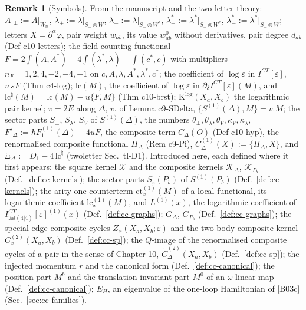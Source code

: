 \documentclass[11pt]{article}
\numberwithin{equation}{section}
\theoremstyle{plain}
\theoremstyle{definition}
\newtheorem{remark}[theorem]{Remark}
\newcommand{\Ap}{A|_{\perp}}
\begin{document}
\begin{remark}[Symbols]
\label{rem:cc-symbols}
From the manuscript and the two-letter theory: $\Ap:=A|_{W_{\mathbb R}^\perp}$, $\lambda_+:=\lambda|_{S_+\otimes W}$, $\lambda_-:=\lambda|_{S_-\otimes W^*}$, $\lambda^*_+:=\lambda^*|_{S_+\otimes W^*}$, $\lambda^*_-:=\lambda^*|_{S_-\otimes W}$; letters $X=\partial^\alpha\varphi$, pair weight $w_{ab}$, its value $w^0_{ab}$ without derivatives, pair degree $d_{ab}$ (Def c10-letters); the field-counting functional $F=2\int(A,A^*)-4\int(\lambda^*,\lambda)-\int(c^*,c)$ with multipliers $n_F=1,2,4,-2,-4,-1$ on $c,A,\lambda,A^*,\lambda^*,c^*$; the coefficient of $\log\varepsilon$ in $I^{CT}[\varepsilon]$, $u\,sF$ (Thm c4-log); $\mathrm{lc}(M)$, the coefficient of $\log\varepsilon$ in $\partial_\delta I^{CT}[\varepsilon](M)$, and $\mathrm{lc}^\natural(M)=\mathrm{lc}(M)-u\{F,M\}$ (Thm c10-brst); $\mathrm K^{\log}(X_a,X_b)$ the logarithmic pair kernel; $v=2E$ along $\Delta$, $v.$ of Lemma c9-SDelta, $\{S^{(1)}(\Delta),M\}=v.M$; the sector parts $S_\perp$, $S_\lambda$, $S_V$ of $S^{(1)}(\Delta)$, the numbers $\theta_\perp,\theta_\lambda,\theta_V,\kappa_V,\kappa_\lambda$, $F'_\Delta:=\hbar F_1^{(1)}(\Delta)-4uF$, the composite term $C_\Delta(O)$ (Def c10-hyp), the renormalised composite functional $\Pi_\Delta$ (Rem c9-Pi), $C^{(1)}_\Delta(X):=\{\Pi_\Delta,X\}$, and $\Xi_\Delta:=D_1-4\,\mathrm{lc}^\natural$ (twoletter Sec.~tl-D1). Introduced here, each defined where it first appears: the square kernel $\mathcal X$ and the composite kernels $\mathcal K_\Delta$, $\mathcal K_{P_b}$ (Def.~\ref{def:cc-kernels}); the sector parts $S_\diamond(P_b)$ of $S^{(1)}(P_b)$ (Def.~\ref{def:cc-kernels}); the arity-one counterterm $\mathrm{ct}^{(1)}_x(M)$ of a local functional, its logarithmic coefficient $\mathrm{lc}^{(1)}_x(M)$, and $L^{(1)}(x)$, the logarithmic coefficient of $I^{CT}_{\mathfrak{psl}(4|4)}[\varepsilon]^{(1)}(x)$ (Def.~\ref{def:cc-graphs}); $G_\Delta$, $G_{P_b}$ (Def.~\ref{def:cc-graphs}); the special-edge composite cycles $Z_x(X_a,X_b;\varepsilon)$ and the two-body composite kernel $C^{(2)}_x(X_a,X_b)$ (Def.~\ref{def:cc-sp}); the $Q$-image of the renormalised composite cycles of a pair in the sense of Chapter 10, $\widetilde C^{(2)}_\Delta(X_a,X_b)$ (Def.~\ref{def:cc-sp}); the injected momentum $r$ and the canonical form (Def.~\ref{def:cc-canonical}); the position part $M^b$ and the translation-invariant part $M^0$ of an $\omega$-linear map (Def.~\ref{def:cc-canonical}); $E_H$, an eigenvalue of the one-loop Hamiltonian of [B03c] (Sec.~\ref{sec:cc-families}).
\end{remark}
\end{document}

